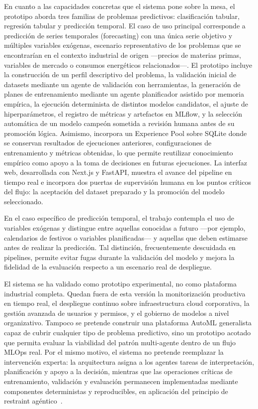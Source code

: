 \documentclass[12pt,a4paper]{article}
\theoremstyle{plain}
\begin{document}
En cuanto a las capacidades concretas que el sistema pone sobre la mesa, el prototipo aborda tres familias de problemas predictivos: clasificación tabular, regresión tabular y predicción temporal. El caso de uso principal corresponde a predicción de series temporales (forecasting) con una única serie objetivo y múltiples variables exógenas, escenario representativo de los problemas que se encontrarían en el contexto industrial de origen ---precios de materias primas, variables de mercado o consumos energéticos relacionados---. El prototipo incluye la construcción de un perfil descriptivo del problema, la validación inicial de datasets mediante un agente de validación con herramientas, la generación de planes de entrenamiento mediante un agente planificador asistido por memoria empírica, la ejecución determinista de distintos modelos candidatos, el ajuste de hiperparámetros, el registro de métricas y artefactos en MLflow, y la selección automática de un modelo campeón sometida a revisión humana antes de su promoción lógica. Asimismo, incorpora un Experience Pool sobre SQLite donde se conservan resultados de ejecuciones anteriores, configuraciones de entrenamiento y métricas obtenidas, lo que permite reutilizar conocimiento empírico como apoyo a la toma de decisiones en futuras ejecuciones. La interfaz web, desarrollada con Next.js y FastAPI, muestra el avance del pipeline en tiempo real e incorpora dos puertas de supervisión humana en los puntos críticos del flujo: la aceptación del dataset preparado y la promoción del modelo seleccionado. %

En el caso específico de predicción temporal, el trabajo contempla el uso de variables exógenas y distingue entre aquellas conocidas a futuro ---por ejemplo, calendarios de festivos o variables planificadas--- y aquellas que deben estimarse antes de realizar la predicción. Tal distinción, frecuentemente descuidada en pipelines, permite evitar fugas durante la validación del modelo y mejora la fidelidad de la evaluación respecto a un escenario real de despliegue.

El sistema se ha validado como prototipo experimental, no como plataforma industrial completa. Quedan fuera de esta versión la monitorización productiva en tiempo real, el despliegue continuo sobre infraestructura cloud corporativa, la gestión avanzada de usuarios y permisos, y el gobierno de modelos a nivel organizativo. Tampoco se pretende construir una plataforma AutoML generalista capaz de cubrir cualquier tipo de problema predictivo, sino un prototipo acotado que permita evaluar la viabilidad del patrón multi-agente dentro de un flujo MLOps real. Por el mismo motivo, el sistema no pretende reemplazar la intervención experta: la arquitectura asigna a los agentes tareas de interpretación, planificación y apoyo a la decisión, mientras que las operaciones críticas de entrenamiento, validación y evaluación permanecen implementadas mediante componentes deterministas y reproducibles, en aplicación del principio de restraint agéntico~\cite{anthropic_agents}.
\end{document}
